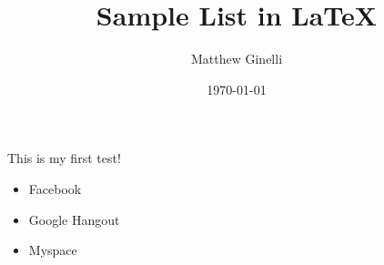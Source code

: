 \documentclass[a4paper,12pt]{article}
\title{Sample List in LaTeX}
\author{Matthew Ginelli}
\date{\today}
\begin{document}
\maketitle

This is my first test!

\begin{itemize}
	\item Facebook
	\item Google Hangout
	\item Myspace
\end{itemize}
\end{document}
